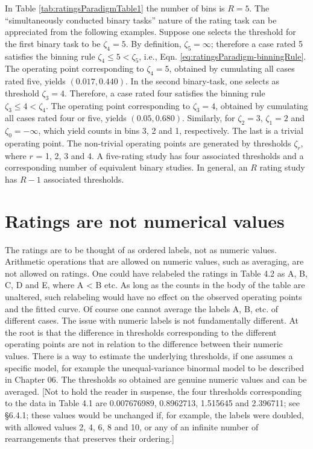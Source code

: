 \documentclass[
]{book}
\begin{document}
In Table \ref{tab:ratingsParadigmTable1} the number of bins is \(R = 5\). The ``simultaneously conducted binary tasks'' nature of the rating task can be appreciated from the following examples. Suppose one selects the threshold for the first binary task to be \(\zeta_4 = 5\). By definition, \(\zeta_5 = \infty\); therefore a case rated 5 satisfies the binning rule \(\zeta_4 \leq 5 < \zeta_5\), i.e., Eqn. \eqref{eq:ratingsParadigm-binningRule}. The operating point corresponding to \(\zeta_4 = 5\), obtained by cumulating all cases rated five, yields \((0.017, 0.440)\). In the second binary-task, one selects as threshold \(\zeta_3 = 4\). Therefore, a case rated four satisfies the binning rule \(\zeta_3 \leq 4 < \zeta_4\). The operating point corresponding to \(\zeta_3 = 4\), obtained by cumulating all cases rated four or five, yields \((0.05, 0.680)\). Similarly, for \(\zeta_2 = 3\), \(\zeta_1 = 2\) and \(\zeta_0 = -\infty\), which yield counts in bins 3, 2 and 1, respectively. The last is a trivial operating point. The non-trivial operating points are generated by thresholds \(\zeta_r\), where \(r\) = 1, 2, 3 and 4. A five-rating study has four associated thresholds and a corresponding number of equivalent binary studies. In general, an \(R\) rating study has \(R-1\) associated thresholds.

\hypertarget{ratings-are-not-numerical-values}{%
\section{Ratings are not numerical values}\label{ratings-are-not-numerical-values}}

The ratings are to be thought of as ordered labels, not as numeric values. Arithmetic operations that are allowed on numeric values, such as averaging, are not allowed on ratings. One could have relabeled the ratings in Table 4.2 as A, B, C, D and E, where A \textless{} B etc. As long as the counts in the body of the table are unaltered, such relabeling would have no effect on the observed operating points and the fitted curve. Of course one cannot average the labels A, B, etc. of different cases. The issue with numeric labels is not fundamentally different. At the root is that the difference in thresholds corresponding to the different operating points are not in relation to the difference between their numeric values. There is a way to estimate the underlying thresholds, if one assumes a specific model, for example the unequal-variance binormal model to be described in Chapter 06. The thresholds so obtained are genuine numeric values and can be averaged. {[}Not to hold the reader in suspense, the four thresholds corresponding to the data in Table 4.1 are 0.007676989, 0.8962713, 1.515645 and 2.396711; see §6.4.1; these values would be unchanged if, for example, the labels were doubled, with allowed values 2, 4, 6, 8 and 10, or any of an infinite number of rearrangements that preserves their ordering.{]}
\end{document}
